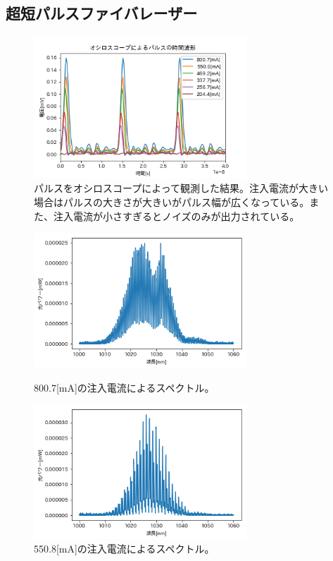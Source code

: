\documentclass[titlepage]{jsarticle}
\begin{document}
\subsection{超短パルスファイバレーザー}
\begin{figure}[htbp]
 \begin{minipage}{0.5\hsize}
  \begin{center}
   \includegraphics[width=80mm]{palse_osiro.png}
  \end{center}
  \caption{パルスをオシロスコープによって観測した結果。注入電流が大きい場合はパルスの大きさが大きいがパルス幅が広くなっている。また、注入電流が小さすぎるとノイズのみが出力されている。}
  \label{} \end{minipage}
\end{figure}
\begin{figure}[htbp]
 \begin{minipage}{0.5\hsize}
  \begin{center}
   \includegraphics[width=80mm]{800_7[mA].png}
  \end{center}
  \caption{800.7[mA]の注入電流によるスペクトル。}
  \label{fig:800_7}
 \end{minipage}
 \begin{minipage}{0.5\hsize}
  \begin{center}
   \includegraphics[width=80mm]{550_8[mA].png}
  \end{center}
  \caption{550.8[mA]の注入電流によるスペクトル。}
  \label{fig:550_8}
 \end{minipage}
\end{figure}
\end{document}

